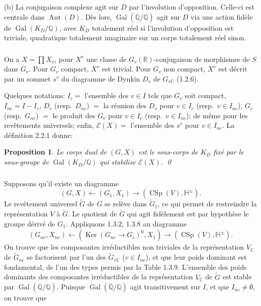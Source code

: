 \documentclass[12pt,a4paper]{article}
\theoremstyle{plain}
\newtheorem{proposition}[theorem]{Proposition}
\theoremstyle{definition}
\theoremstyle{remark}
\DeclareMathOperator{\CSp}{CSp}
\DeclareMathOperator{\Gal}{Gal}
\DeclareMathOperator{\Ker}{Ker}
\DeclareMathOperator{\Aut}{Aut}
\newcommand{\QQ}{\mathbb{Q}}
\newcommand{\RR}{\mathbb{R}}
\newcommand{\CC}{\mathbb{C}}
\newcommand{\HH}{\mathbb{H}}
\begin{document}
(b) La conjugaison complexe agit sur $D$ par l'involution d'opposition. Celle-ci est centrale dans $\Aut(D)$. D\`es lors, $\Gal(\overline{\QQ}/\QQ)$ agit sur $D$ via une action fid\`ele de $\Gal(K_D/\QQ)$, avec $K_D$ totalement r\'eel si l'involution d'opposition est triviale, quadratique totalement imaginaire sur un corps totalement r\'eel sinon.

\subsubsection{}

On a $X = \prod X_v$, pour $X^v$ une classe de $G_v(\RR)$-conjugaison de morphismes de $S$ dans $G_v$. Pour $G_v$ compact, $X^v$ est trivial. Pour $G_v$ non compact, $X^v$ est d\'ecrit par un sommet $s^v$ du diagramme de Dynkin $D_v$ de $G_{v\CC}$ (1.2.6).

Quelques notations: $I_c =$ l'ensemble des $v \in I$ tels que $G_v$ soit compact, $I_{nc} = I - I_c$, $D_c$ (resp.~$D_{nc}$) $=$ la r\'eunion des $D_v$ pour $v \in I_c$ (resp.~$v \in I_{nc}$), $G_c$ (resp.~$G_{nc}$) $=$ le produit des $G_v$ pour $v \in I_c$ (resp.~$v \in I_{nc}$); de m\^eme pour les rev\^etements universels; enfin, $\mathcal{E}(X) =$ l'ensemble des $s^v$ pour $v \in I_{nc}$. La d\'efinition 2.2.1 donne:

\begin{proposition}
Le corps dual de $(G,X)$ est le sous-corps de $K_D$ fix\'e par le sous-groupe de $\Gal(K_D/\QQ)$ qui stabilise $\mathcal{E}(X)$.
\qed
\end{proposition}

\subsubsection{}

Supposons qu'il existe un diagramme
\begin{equation}\label{eq:2.3.7.1}
(G,X) \longleftarrow (G_1,X_1) \longrightarrow (\CSp(V),\HH^{\pm}).
\end{equation}
Le rev\^etement universel $\tilde{G}$ de $G$ se rel\`eve dans $\tilde{G}_1$, ce qui permet de restreindre la repr\'esentation $V$ \`a $\tilde{G}$. Le quotient de $\tilde{G}$ qui agit fid\`element est par hypoth\`ese le groupe d\'eriv\'e de $G_1$. Appliquons 1.3.2, 1.3.8 au diagramme
\[
(G_{nc}, X_{nc}) \longleftarrow (\Ker(G_{nc} \to G_c)^0, X_1) \longrightarrow (\CSp(V),\HH^{\pm}).
\]
On trouve que les composantes irr\'eductibles non triviales de la repr\'esentation $V_{\CC}$ de $\tilde{G}_{nc}$ se factorisent par l'un des $\tilde{G}_{v\CC}$ ($v \in I_{nc}$), et que leur poids dominant est fondamental, de l'un des types permis par la Table 1.3.9. L'ensemble des poids dominants des composantes irr\'eductibles de la repr\'esentation $V_{\CC}$ de $\tilde{G}$ est stable par $\Gal(\overline{\QQ}/\QQ)$. Puisque $\Gal(\overline{\QQ}/\QQ)$ agit transitivement sur $I$, et que $I_{nc} \neq \emptyset$, on trouve que
\end{document}
